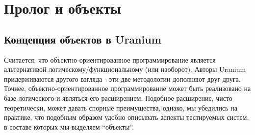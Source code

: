 \documentclass[a4paper]{book}
\def\ur{Uranium}
\begin{document}
\begin{comment}
После скачивания исходного кода создаётся каталог uranium-test, в
котором основное пространство занимает подкаталог U-238/u. Сейчас
мы рассмотрим структуру этого каталога:

\begin{verbatim}
action
algorithm
gt
html
http
internal
internet
nfa
parser
rand
regex
tc_support
util
v
ixpath.pl
ur_atoms.pl
ur_fixed.pl
ur_io.pl
ur_lists.pl
ur_math.pl
ur_messages.pl
...
\end{verbatim}

Это и есть библиотека \ur.

\section{Каталог lib}

Это фундамент. Содержит базовые пакеты.

\begin{description} 
\item ur_objects.pl данный пакет реализует концепцию
  объектов, которой будет посвящена глава \ref{ur_objects}.
\item ur_recorded_db.pl объектная база данных, которая
  будет рассмотрена в главе \ref{ur_recorded_db}.
\end{description}

\section{Каталог logging}

Гибкое логирование --- важная составная часть системы автотестов.

\begin{description}
\item logging.pl содержит базовые предикаты, см. главу
  \ref{logging}.
\end{description}
\end{comment}

\chapter{Пролог и объекты}
\label{ur_objects}

\section{Концепция объектов в \ur}
Считается, что объектно-ориентированное программирование является
альтернативой логическому/функциональному (или наоборот). Авторы
\ur{} придерживаются другого взгляда - эти две методологии
дополняют друг друга. Точнее, объектно-ориентированное
программирование может быть реализовано на базе логического и
являться его расширением. Подобное расширение, чисто
теоретически, может давать спорные преимущества, однако, мы
убедились на практике, что подобным образом удобно описывать
аспекты тестируемых систем, в составе которых мы выделяем
``объекты''. 
\end{document}
